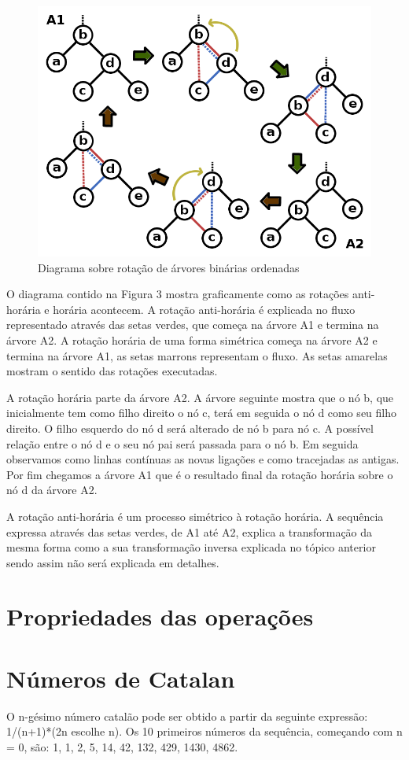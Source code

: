 \begin{figure}[H]
	\caption{\label{gram_cls}Diagrama sobre rotação de árvores binárias ordenadas}
	\begin{center}
	    \includegraphics[scale=0.25]{tree_rotations.png}
	\end{center}
\end{figure}

O diagrama contido na Figura 3 mostra graficamente como as rotações anti-horária e horária acontecem. A rotação anti-horária é explicada no fluxo representado através das setas verdes, que começa na árvore A1 e termina na árvore A2. A rotação horária de uma forma simétrica começa na árvore A2 e termina na árvore A1, as setas marrons representam o fluxo. As setas amarelas mostram o sentido das rotações executadas.

A rotação horária parte da árvore A2. A árvore seguinte mostra que o nó b, que inicialmente tem como filho direito o nó c, terá em seguida o nó d como seu filho direito. O filho esquerdo do nó d será alterado de nó b para nó c. A possível relação entre o nó d e o seu nó pai será passada para o nó b. Em seguida observamos como linhas contínuas as novas ligações e como tracejadas as antigas. Por fim chegamos a árvore A1 que é o resultado final da rotação horária sobre o nó d da árvore A2.

A rotação anti-horária é um processo simétrico à rotação horária. A sequência expressa através das setas verdes, de A1 até A2, explica a transformação da mesma forma como a sua transformação inversa explicada no tópico anterior sendo assim não será explicada em detalhes.

\chapter{Propriedades das operações}

\chapter{Números de Catalan}
O n-gésimo número catalão pode ser obtido a partir da seguinte expressão: 1/(n+1)*(2n escolhe n). Os 10 primeiros números da sequência, começando com n = 0, são: 1, 1, 2, 5, 14, 42, 132, 429, 1430, 4862.
